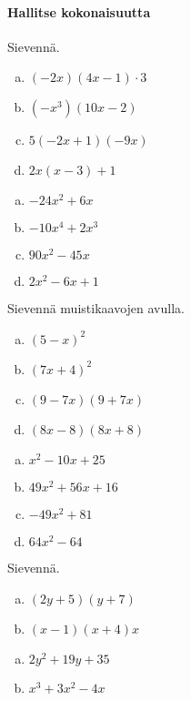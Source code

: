 \paragraph*{Hallitse kokonaisuutta}

\begin{tehtava}
    Sievennä.
    \begin{enumerate}[a)]
        \item $(-2x)(4x - 1)\cdot 3$
        \item $(-x^3)(10x - 2)$
        \item $5(-2x + 1)(-9x) $
        \item $2x(x-3)+1$
    \end{enumerate}
    \begin{vastaus}
        \begin{enumerate}[a)]
            \item $-24x^2 + 6x$
            \item $-10x^4 + 2x^3$
            \item $90x^2 - 45x$
            \item $2x^2-6x+1$
        \end{enumerate}
    \end{vastaus}
\end{tehtava}

\begin{tehtava}
    Sievennä muistikaavojen avulla.
    \begin{enumerate}[a)]
        \item $(5-x)^2$
        \item $(7x + 4)^2$
        \item $(9 - 7x)(9 + 7x)$
        \item $(8x - 8)(8x + 8)$
    \end{enumerate}
    \begin{vastaus}
        \begin{enumerate}[a)]
            \item $x^2 - 10x + 25$
            \item $49x^2 + 56x + 16$
            \item $-49x^2 + 81$
            \item $64x^2 - 64$
        \end{enumerate}
    \end{vastaus}
\end{tehtava}

\begin{tehtava}
    Sievennä.
    \begin{enumerate}[a)]
        \item $(2y+5)(y+7)$
        \item $(x-1)(x+4)x$
    \end{enumerate}
    \begin{vastaus}
        \begin{enumerate}[a)]
            \item $2y^2 + 19y + 35$
            \item $x^3 + 3x^2 - 4x$
        \end{enumerate}
    \end{vastaus}
\end{tehtava}

